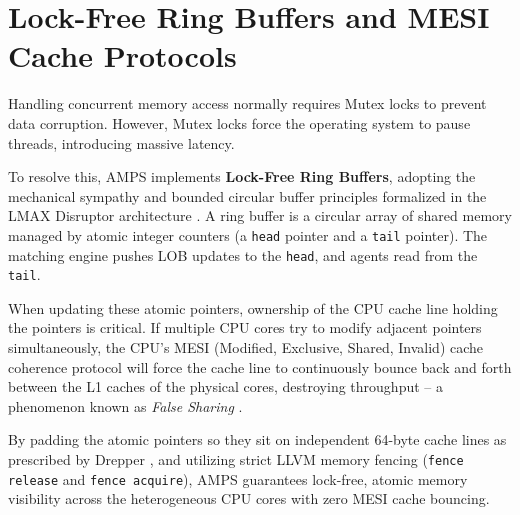 \section{Lock-Free Ring Buffers and MESI Cache Protocols}

Handling concurrent memory access normally requires Mutex locks to prevent data corruption. However, Mutex locks force the operating system to pause threads, introducing massive latency.

To resolve this, AMPS implements \textbf{Lock-Free Ring Buffers}, adopting the mechanical sympathy and bounded circular buffer principles formalized in the LMAX Disruptor architecture \cite{thompson2011disruptor}. A ring buffer is a circular array of shared memory managed by atomic integer counters (a \texttt{head} pointer and a \texttt{tail} pointer). The matching engine pushes LOB updates to the \texttt{head}, and agents read from the \texttt{tail}.

When updating these atomic pointers, ownership of the CPU cache line holding the pointers is critical. If multiple CPU cores try to modify adjacent pointers simultaneously, the CPU's MESI (Modified, Exclusive, Shared, Invalid) cache coherence protocol will force the cache line to continuously bounce back and forth between the L1 caches of the physical cores, destroying throughput -- a phenomenon known as \textit{False Sharing} \cite{drepper2007memory}. 

By padding the atomic pointers so they sit on independent 64-byte cache lines as prescribed by Drepper \cite{drepper2007memory}, and utilizing strict LLVM memory fencing (\texttt{fence release} and \texttt{fence acquire}), AMPS guarantees lock-free, atomic memory visibility across the heterogeneous CPU cores with zero MESI cache bouncing.
